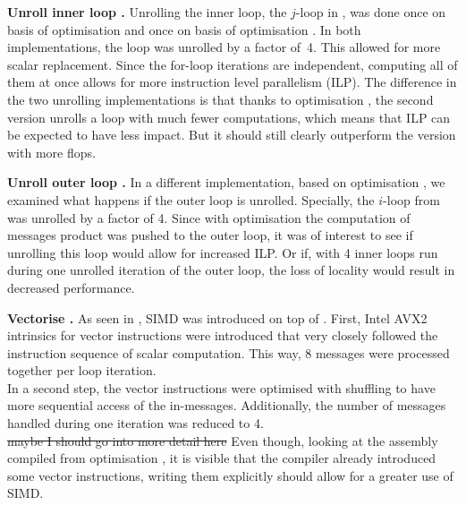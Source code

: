 \documentclass[letterpaper]{article}
\let\cref=\Cref %
\newcommand{\mypar}[1]{{\bf #1.}}
\begin{document}
\mypar{Unroll inner loop }
Unrolling the inner loop, the $j$-loop in \cref{algo:propagate}, was done once on basis of optimisation  and once on basis of optimisation . In both implementations, the loop was unrolled by a factor of~4. This allowed for more scalar replacement. Since the for-loop iterations are independent, computing all of them at once allows for more instruction level parallelism (ILP).
The difference in the two unrolling implementations is that thanks to optimisation , the second version unrolls a loop with much fewer computations, which means that ILP can be expected to have less impact. But it should still clearly outperform the version  with more flops.


\mypar{Unroll outer loop }
In a different implementation, based on optimisation , we examined what happens if the outer loop is unrolled. Specially, the $i$-loop from \cref{algo:propagate} was unrolled by a factor of 4. Since with optimisation  the computation of messages product was pushed to the outer loop, it was of interest to see if unrolling this loop would allow for increased ILP. Or if, with 4 inner loops run during one unrolled iteration of the outer loop, the loss of locality would result in decreased performance.

\mypar{Vectorise }
As seen in \cref{OptDiagram}, SIMD was introduced on top of . First, Intel AVX2 intrinsics for vector instructions were introduced that very closely followed the instruction sequence of scalar computation. This way, 8 messages were processed together per loop iteration.\\
In a second step, the vector instructions were optimised with shuffling to have more sequential access of the in-messages. Additionally, the number of messages handled during one iteration was reduced to 4.\\ \st{maybe I should go into more detail here}
Even though, looking at the assembly compiled from optimisation , it is visible that the compiler already introduced some vector instructions, writing them explicitly should allow for a greater use of SIMD.
\end{document}
